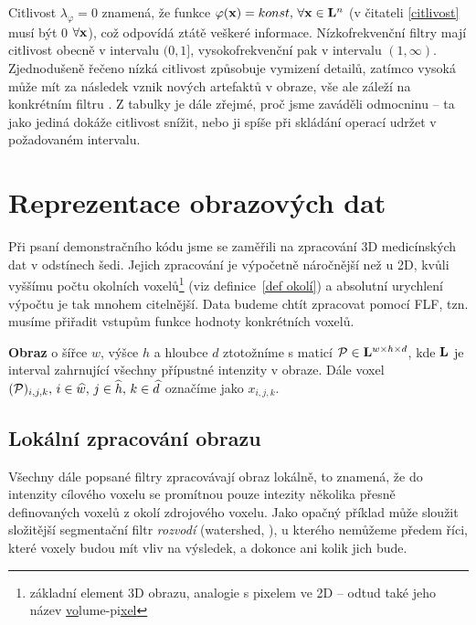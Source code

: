 Citlivost $\lambda_\varphi = 0$ znamená, že funkce $\varphi(\mathbf{x}) = konst, \, \forall \mathbf{x} \in \mathbf{L}^n$ (v čitateli \eqref{citlivost} musí být 0 $\forall \mathbf{x}$), což odpovídá ztátě veškeré informace. Nízkofrekvenční filtry mají citlivost obecně v intervalu $(0,1]$, vysokofrekvenční pak v intervalu $(1,\infty)$. Zjednodušeně řečeno nízká citlivost způsobuje vymizení detailů, zatímco vysoká může mít za následek vznik nových artefaktů v obraze, vše ale záleží na konkrétním filtru . Z tabulky je dále zřejmé, proč jsme zaváděli odmocninu -- ta jako jediná dokáže citlivost snížit, nebo ji spíše při skládání operací udržet v požadovaném intervalu. 


\section{Reprezentace obrazových dat}

Při psaní demonstračního kódu jsme se zaměřili na zpracování 3D medicínských dat v odstínech šedi. Jejich zpracování je výpočetně náročnější než u 2D, kvůli vyššímu počtu okolních voxelů\footnote{základní element 3D obrazu, analogie s pixelem ve 2D -- odtud také jeho název \bq \underline{vo}lume-pi\underline{xel}\eq} (viz definice~\ref{def okolí}) a absolutní urychlení výpočtu je tak mnohem citelnější. Data budeme chtít zpracovat pomocí FLF, tzn. musíme přiřadit vstupům funkce hodnoty konkrétních voxelů.

\begin{define}\label{def obraz}
  \textbf{Obraz} o šířce $w$, výšce $h$ a hloubce $d$ ztotožníme s maticí $\mathcal{P} \in \mathbf{L}^{w\times h\times d}$, kde $\mathbf{L}$ je interval zahrnující všechny přípustné intenzity v obraze. Dále voxel $(\mathcal{P})_{i,j,k}, \,i \in \widehat w, \,j \in \widehat h, \,k \in \widehat d$ označíme jako $x_{i,j,k}$.
\end{define}

    \subsection{Lokální zpracování obrazu}\label{lokální zprac}
    Všechny dále popsané filtry zpracovávají obraz lokálně, to znamená, že do intenzity cílového voxelu se promítnou pouze intezity několika přesně definovaných voxelů z okolí zdrojového voxelu. Jako opačný příklad může sloužit složitější segmentační filtr \emph{rozvodí} (watershed, \cite{Charypar}), u kterého nemůžeme předem říci, které voxely budou mít vliv na výsledek, a dokonce ani kolik jich bude.

